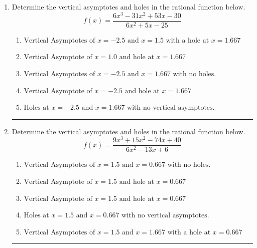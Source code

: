 \documentclass[14pt]{extbook}
\newcommand{\litem}[1]{\item#1\hspace*{-1cm}\rule{\textwidth}{0.4pt}}
\begin{document}
\begin{enumerate}
{\begin{enumerate}[label=\Alph*.]
\end{enumerate} }
\litem{
Determine the vertical asymptotes and holes in the rational function below.\[ f(x) = \frac{6x^{3} -31 x^{2} +53 x -30}{6x^{2} +5 x -25} \]\begin{enumerate}[label=\Alph*.]
\item \( \text{Vertical Asymptotes of } x = -2.5 \text{ and } x = 1.5 \text{ with a hole at } x = 1.667 \)
\item \( \text{Vertical Asymptote of } x = 1.0 \text{ and hole at } x = 1.667 \)
\item \( \text{Vertical Asymptotes of } x = -2.5 \text{ and } x = 1.667 \text{ with no holes.} \)
\item \( \text{Vertical Asymptote of } x = -2.5 \text{ and hole at } x = 1.667 \)
\item \( \text{Holes at } x = -2.5 \text{ and } x = 1.667 \text{ with no vertical asymptotes.} \)

\end{enumerate} }
\litem{
Determine the vertical asymptotes and holes in the rational function below.\[ f(x) = \frac{9x^{3} +15 x^{2} -74 x + 40}{6x^{2} -13 x + 6} \]\begin{enumerate}[label=\Alph*.]
\item \( \text{Vertical Asymptotes of } x = 1.5 \text{ and } x = 0.667 \text{ with no holes.} \)
\item \( \text{Vertical Asymptote of } x = 1.5 \text{ and hole at } x = 0.667 \)
\item \( \text{Vertical Asymptote of } x = 1.5 \text{ and hole at } x = 0.667 \)
\item \( \text{Holes at } x = 1.5 \text{ and } x = 0.667 \text{ with no vertical asymptotes.} \)
\item \( \text{Vertical Asymptotes of } x = 1.5 \text{ and } x = 1.667 \text{ with a hole at } x = 0.667 \)

\end{enumerate} }
\end{enumerate}
\end{document}
